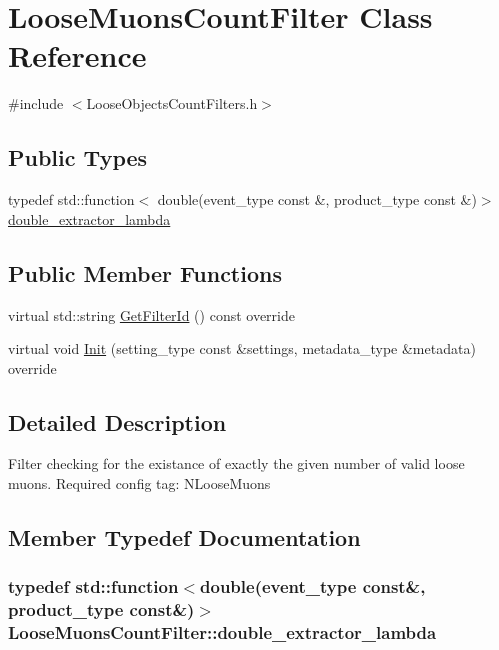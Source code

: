 \hypertarget{classLooseMuonsCountFilter}{
\section{LooseMuonsCountFilter Class Reference}
\label{classLooseMuonsCountFilter}
}


{\ttfamily \#include $<$LooseObjectsCountFilters.h$>$}\subsection*{Public Types}
\begin{DoxyCompactItemize}
\item 
typedef std::function$<$ double(event\_\-type const \&, product\_\-type const \&)$>$ \hyperlink{classLooseMuonsCountFilter_a017ecff0b747ccb8a1cfff22ee97796a}{double\_\-extractor\_\-lambda}
\end{DoxyCompactItemize}
\subsection*{Public Member Functions}
\begin{DoxyCompactItemize}
\item 
virtual std::string \hyperlink{classLooseMuonsCountFilter_a557a83e2f449d46c65d7a1245c83fe20}{GetFilterId} () const override
\item 
virtual void \hyperlink{classLooseMuonsCountFilter_a494858cc791d4765dd421a36aafcd3ef}{Init} (setting\_\-type const \&settings, metadata\_\-type \&metadata) override
\end{DoxyCompactItemize}


\subsection{Detailed Description}
Filter checking for the existance of exactly the given number of valid loose muons. Required config tag: NLooseMuons 

\subsection{Member Typedef Documentation}
\hypertarget{classLooseMuonsCountFilter_a017ecff0b747ccb8a1cfff22ee97796a}{
\subsubsection[{double\_\-extractor\_\-lambda}]{\setlength{\rightskip}{0pt plus 5cm}typedef std::function$<$double(event\_\-type const\&, product\_\-type const\&)$>$ {\bf LooseMuonsCountFilter::double\_\-extractor\_\-lambda}}}
\label{classLooseMuonsCountFilter_a017ecff0b747ccb8a1cfff22ee97796a}


